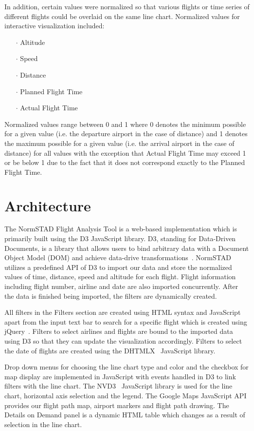 \documentclass{sig-alternate}
\begin{document}
In addition, certain values were normalized
so that various flights or time series of different
flights could be overlaid on the same line chart.
Normalized values for interactive visualization
included:
\begin{itemize}
\item[$\cdot$] Altitude
\item[$\cdot$] Speed
\item[$\cdot$] Distance
\item[$\cdot$] Planned Flight Time 
\item[$\cdot$] Actual Flight Time
\end{itemize}

Normalized values range between 0 and 1
where 0 denotes the minimum possible for a given value (i.e. the departure airport
in the case of distance) and 1 denotes the maximum possible 
for a given value (i.e. the arrival airport in the case of distance) 
for all values with the exception that Actual Flight Time may
exceed 1 or be below 1 due to the fact that it does not correspond exactly 
to the Planned Flight Time.

\section{Architecture}
\label{sec-architecture}

The NormSTAD Flight Analysis Tool is a web-based implementation which is primarily built
using the D3 JavaScript library. D3, standing for Data-Driven Documents, is a 
library that allows users to bind arbitrary data with a Document Object Model (DOM)
and achieve data-drive transformations~\cite{D3}. NormSTAD utilizes a predefined API of D3
to import our data and store the normalized values of time, distance, speed and altitude
for each flight. Flight information including flight number, airline and date are also imported
concurrently. After the data is finished being imported, the filters are dynamically created.

All filters in the Filters section
 are created using HTML syntax and JavaScript apart from the input text bar
to search for a specific flight which is created using jQuery~\cite{jQuery}.
Filters to select airlines and flights are bound to the imported data using D3 so that
they can update the visualization accordingly. Filters to select the date of flights
are created using the DHTMLX~\cite{DHTMLX} JavaScript library.

Drop down menus for choosing the line chart type and color and the checkbox for map display
are implemented in JavaScript with events handled in D3 to link filters with the line chart.
The NVD3~\cite{NVD3} JavaScript library is used for the line chart, horizontal axis 
selection and the legend. The Google Maps JavaScript API provides our flight path map,
airport markers and flight path drawing. The Details on Demand panel is a dynamic
HTML table which changes as a result of selection in the line chart.
\end{document}
